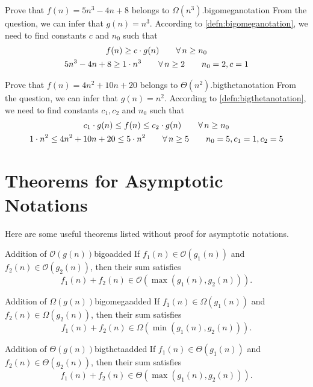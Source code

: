 \begin{exampletcb}
    {Prove that \mbox{\(f(n) = 5n^3 - 4n + 8\)} belongs to \mbox{\(\Omega(n^3)\)}.}{bigomeganotation}
    From the question, we can infer that \mbox{\(g(n) = n^3\)}. According to \cref{defn:bigomeganotation}, we need to find constants \mbox{\(c\)} and \mbox{\(n_0\)} such that
    \begin{gather*}
        f(n) \geq c \cdot g(n) \qquad \forall\, n\geq n_0\\
        5n^3 - 4n + 8 \geq 1 \cdot n^3 \qquad \forall\, n\geq 2 \tag*{\mbox{\(n_0 = 2, c=1\)}}
    \end{gather*}
\end{exampletcb}

\begin{exampletcb}
    {Prove that \mbox{\(f(n) = 4n^2 + 10n + 20\)} belongs to \mbox{\(\Theta(n^2)\)}.}{bigthetanotation}
    From the question, we can infer that \mbox{\(g(n) = n^2\)}. According to \cref{defn:bigthetanotation}, we need to find constants \mbox{\(c_1, c_2\)} and \mbox{\(n_0\)} such that
    \begin{gather*}
        c_1 \cdot g(n) \leq f(n) \leq c_2 \cdot g(n) \qquad \forall\, n\geq n_0\\
        1 \cdot n^2 \leq 4n^2 + 10n + 20 \leq 5 \cdot n^2 \qquad \forall\, n\geq 5 \tag*{\mbox{\(n_0 = 5, c_1=1, c_2=5\)}}
    \end{gather*}
\end{exampletcb}

\section{Theorems for Asymptotic Notations}
Here are some useful theorems listed without proof for asymptotic notations.
\begin{theoremtcb}
    {Addition of \mbox{\(\mathcal{O}(g(n))\)}}{bigoadded}
    If \mbox{\(f_1(n) \in \mathcal{O}(g_1(n))\)} and \mbox{\(f_2(n) \in \mathcal{O}(g_2(n))\)}, then their sum satisfies
    \[
        f_1(n) + f_2(n) \in \mathcal{O}(\max(g_1(n), g_2(n))).
    \]
\end{theoremtcb}

\begin{theoremtcb}
    {Addition of \mbox{\(\Omega(g(n))\)}}{bigomegaadded}
    If \mbox{\(f_1(n) \in \Omega(g_1(n))\)} and \mbox{\(f_2(n) \in \Omega(g_2(n))\)}, then their sum satisfies
    \[
        f_1(n) + f_2(n) \in \Omega(\min(g_1(n), g_2(n))).
    \]
\end{theoremtcb}

\begin{theoremtcb}
    {Addition of \mbox{\(\Theta(g(n))\)}}{bigthetaadded}
    If \mbox{\(f_1(n) \in \Theta(g_1(n))\)} and \mbox{\(f_2(n) \in \Theta(g_2(n))\)}, then their sum satisfies
    \[
        f_1(n) + f_2(n) \in \Theta(\max(g_1(n), g_2(n))).
    \]
\end{theoremtcb}

